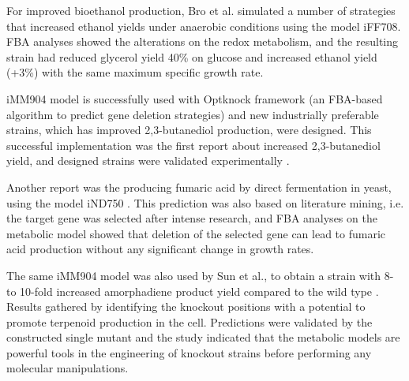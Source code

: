 For improved bioethanol production, Bro et al. simulated a number of strategies that increased ethanol yields under anaerobic conditions using the model 	iFF708\cite{bro2006silico}. FBA analyses showed the alterations on the redox metabolism, and the resulting strain had reduced glycerol yield 40\% on glucose and increased ethanol yield (+3\%) with the same maximum specific growth rate.

iMM904 model is successfully used with Optknock framework \cite{burgard2003optknock} (an FBA-based algorithm to predict gene deletion strategies) and new industrially preferable strains, which has improved 2,3-butanediol production, were designed. This successful implementation was the first report about increased 2,3-butanediol yield, and designed strains were validated experimentally \cite{ng2012production}.

Another report was the producing fumaric acid by direct fermentation in yeast, using the model iND750 \cite{xu2012fumaric}. This prediction was also based on literature mining, i.e. the target gene was selected after intense research, and FBA analyses on the metabolic model showed that deletion of the selected gene can lead to fumaric acid production without any significant change in growth rates.

The same iMM904 model was also used by Sun et al., to obtain a strain with 8- to 10-fold increased amorphadiene product yield compared to the wild type \cite{sun2014identification}. Results gathered by identifying the knockout positions with a potential to promote terpenoid production in the cell. Predictions were validated by the constructed single mutant and the study indicated that the metabolic models are powerful tools in the engineering of knockout strains before performing any molecular manipulations.
